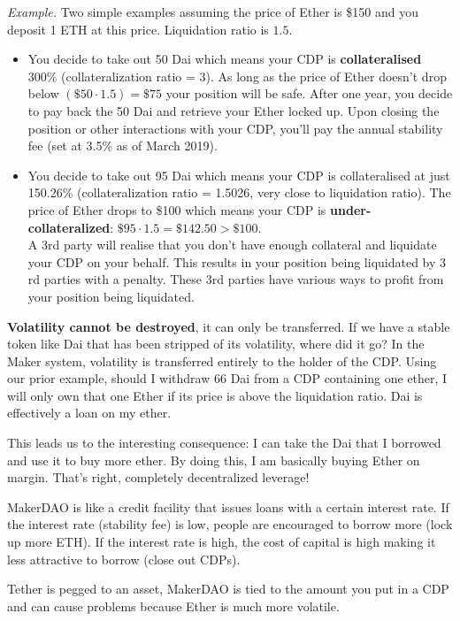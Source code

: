 \emph{Example.} Two simple examples assuming the price of Ether is \$150 and you deposit 1 ETH at this price. Liquidation ratio is $1.5$.
\begin{itemize}
    \item You decide to take out 50 Dai which means your CDP is \textbf{collateralised} 300\% (collateralization ratio = 3). As long as the price of Ether doesn't drop below $(\$50 \cdot 1.5) = \$75$ your position will be safe. After one year, you decide to pay back the 50 Dai and retrieve your Ether locked up. Upon closing the position or other interactions with your CDP, you'll pay the annual stability fee (set at 3.5\% as of March 2019).
    \item You decide to take out 95 Dai which means your CDP is collateralised at just 150.26\% (collateralization ratio = 1.5026, very close to liquidation ratio). The price of Ether drops to \$100 which means your CDP is \textbf{under-collateralized}: $\$95 \cdot 1.5 = \$142.50 > \$100$.\\
    A 3rd party will realise that you don't have enough collateral and liquidate your CDP on your behalf. This results in your position being liquidated by 3 rd parties with a penalty. These 3rd parties have various ways to profit from your position being liquidated.
\end{itemize}

\textbf{Volatility cannot be destroyed}, it can only be transferred. If we have a stable token like Dai that has been stripped of its volatility, where did it go? In the Maker system, volatility is transferred entirely to the holder of the CDP. Using our prior example, should I withdraw 66 Dai from a CDP containing one ether, I will only own that one Ether if its price is above the liquidation ratio. Dai is effectively a loan on my ether.

This leads us to the interesting consequence: I can take the Dai that I borrowed and use it to buy more ether. By doing this, I am basically buying Ether on margin. That's right, completely decentralized leverage!

MakerDAO is like a credit facility that issues loans with a certain interest rate. If the interest rate (stability fee) is low, people are encouraged to borrow more (lock up more ETH). If the interest rate is high, the cost of capital is high making it less attractive to borrow (close out CDPs).

Tether is pegged to an asset, MakerDAO is tied to the amount you put in a CDP and can cause problems because Ether is much more volatile.

